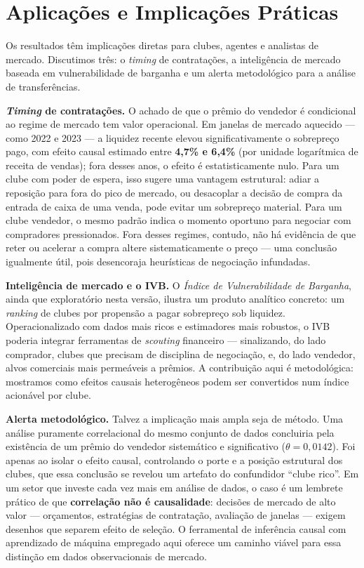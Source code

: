 \section{Aplicações e Implicações Práticas}
\label{sec:aplicacoes}

Os resultados têm implicações diretas para clubes, agentes e analistas de mercado. Discutimos três:
o \textit{timing} de contratações, a inteligência de mercado baseada em vulnerabilidade de barganha
e um alerta metodológico para a análise de transferências.

\textbf{\textit{Timing} de contratações.} O achado de que o prêmio do vendedor é condicional ao
regime de mercado tem valor operacional. Em janelas de mercado aquecido — como 2022 e 2023 — a
liquidez recente elevou significativamente o sobrepreço pago, com efeito causal estimado entre
\textbf{4,7\% e 6,4\%} (por unidade logarítmica de receita de vendas); fora desses anos, o efeito é
estatisticamente nulo. Para um clube com poder de espera, isso sugere uma vantagem estrutural: adiar a
reposição para fora do pico de mercado, ou desacoplar a decisão de compra da entrada de caixa de uma
venda, pode evitar um sobrepreço material. Para um clube vendedor, o mesmo padrão indica o momento
oportuno para negociar com compradores pressionados. Fora desses regimes, contudo, não há evidência
de que reter ou acelerar a compra altere sistematicamente o preço — uma conclusão igualmente útil,
pois desencoraja heurísticas de negociação infundadas.

\textbf{Inteligência de mercado e o IVB.} O \textit{Índice de Vulnerabilidade de Barganha}, ainda que
exploratório nesta versão, ilustra um produto analítico concreto: um \textit{ranking} de clubes por
propensão a pagar sobrepreço sob liquidez. Operacionalizado com dados mais ricos e estimadores mais
robustos, o IVB poderia integrar ferramentas de \textit{scouting} financeiro — sinalizando, do lado
comprador, clubes que precisam de disciplina de negociação, e, do lado vendedor, alvos comerciais
mais permeáveis a prêmios. A contribuição aqui é metodológica: mostramos como efeitos causais
heterogêneos podem ser convertidos num índice acionável por clube.

\textbf{Alerta metodológico.} Talvez a implicação mais ampla seja de método. Uma análise puramente
correlacional do mesmo conjunto de dados concluiria pela existência de um prêmio do vendedor
sistemático e significativo ($\theta = 0{,}0142$). Foi apenas ao isolar o efeito causal, controlando
o porte e a posição estrutural dos clubes, que essa conclusão se revelou um artefato do confundidor
``clube rico''. Em um setor que investe cada vez mais em análise de dados, o caso é um lembrete
prático de que \textbf{correlação não é causalidade}: decisões de mercado de alto valor — orçamentos,
estratégias de contratação, avaliação de janelas — exigem desenhos que separem efeito de seleção.
O ferramental de inferência causal com aprendizado de máquina empregado aqui oferece um caminho
viável para essa distinção em dados observacionais de mercado.
